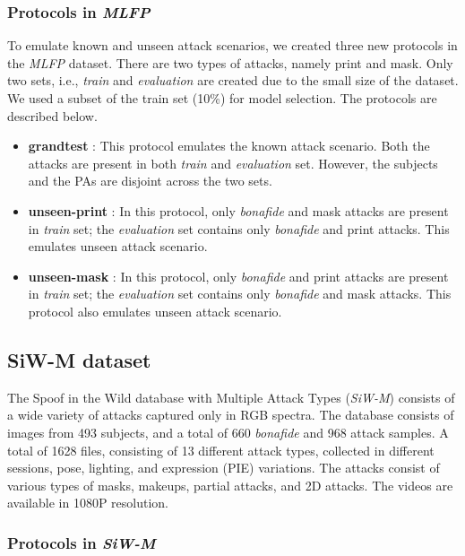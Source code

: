 \documentclass[journal]{IEEEtran}
\begin{document}
\subsubsection{Protocols in \textit{MLFP}}

To emulate known and unseen attack scenarios, we created three new protocols in the \textit{MLFP} dataset. There are two types of attacks, namely print and mask. Only two sets, i.e., \textit{train} and \textit{evaluation} are created due to the small size of the dataset. We used a subset of the train set (10\%) for model selection. The protocols are described below.

\begin{itemize}
    \item \textbf{grandtest} : This protocol emulates the known attack scenario. Both the attacks are present in both \textit{train} and \textit{evaluation} set. However, the subjects and the PAs are disjoint across the two sets.
    \item \textbf{unseen-print} : In this protocol, only \textit{bonafide} and mask attacks are present in \textit{train} set; the \textit{evaluation} set contains only \textit{bonafide} and print attacks. This emulates unseen attack scenario.
    \item \textbf{unseen-mask} : In this protocol, only \textit{bonafide} and print attacks are present in \textit{train} set; the \textit{evaluation} set contains only \textit{bonafide} and mask attacks. This protocol also emulates unseen attack scenario.
\end{itemize}

\subsection{SiW-M dataset}

The Spoof in the Wild database with Multiple Attack Types (\textit{SiW-M}) \cite{Liu_2019_CVPR} consists of a wide variety of attacks captured only in RGB spectra. The database consists of images from 493 subjects, and a total of 660 \textit{bonafide} and 968 attack samples. A total of 1628 files, consisting of 13 different attack types, collected in different sessions, pose, lighting, and expression (PIE) variations. The attacks consist of various types of masks, makeups, partial attacks, and 2D attacks. The videos are available in 1080P resolution.

\subsubsection{Protocols in \textit{SiW-M}}
\end{document}
